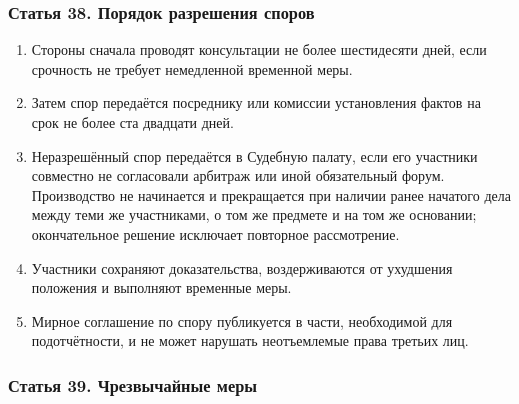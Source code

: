 \documentclass[
  russian,
  11pt,
  a4paper,
]{article}
\providecommand{\tightlist}{%
  \setlength{\itemsep}{0pt}\setlength{\parskip}{0pt}}
\begin{document}
\subsubsection{Статья 38. Порядок разрешения
споров}\label{ux441ux442ux430ux442ux44cux44f-38-ux43fux43eux440ux44fux434ux43eux43a-ux440ux430ux437ux440ux435ux448ux435ux43dux438ux44f-ux441ux43fux43eux440ux43eux432}

\begin{enumerate}
\def\labelenumi{\arabic{enumi}.}
\tightlist
\item
  Стороны сначала проводят консультации не более шестидесяти дней, если
  срочность не требует немедленной временной меры.
\item
  Затем спор передаётся посреднику или комиссии установления фактов на
  срок не более ста двадцати дней.
\item
  Неразрешённый спор передаётся в Судебную палату, если его участники
  совместно не согласовали арбитраж или иной обязательный форум.
  Производство не начинается и прекращается при наличии ранее начатого
  дела между теми же участниками, о том же предмете и на том же
  основании; окончательное решение исключает повторное рассмотрение.
\item
  Участники сохраняют доказательства, воздерживаются от ухудшения
  положения и выполняют временные меры.
\item
  Мирное соглашение по спору публикуется в части, необходимой для
  подотчётности, и не может нарушать неотъемлемые права третьих лиц.
\end{enumerate}

\subsubsection{Статья 39. Чрезвычайные
меры}\label{ux441ux442ux430ux442ux44cux44f-39-ux447ux440ux435ux437ux432ux44bux447ux430ux439ux43dux44bux435-ux43cux435ux440ux44b}
\end{document}
